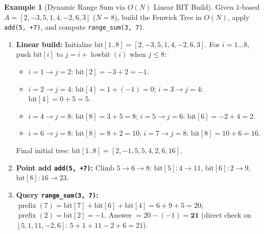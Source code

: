 \documentclass[11pt,a4paper]{article}
\theoremstyle{definition}
\newtheorem{example}{Example}[section]
\begin{document}
\begin{example}[Dynamic Range Sum via $O(N)$ Linear BIT Build]
Given $1$-based $A = [2, -3, 5, 1, 4, -2, 6, 3]$ ($N = 8$), build the Fenwick Tree in $O(N)$, apply \texttt{add(5, +7)}, and compute \texttt{range\_sum(3, 7)}.
\begin{enumerate}[itemsep=2pt, topsep=2pt]
    \item \textbf{Linear build:} Initialize $\text{bit}[1..8] = [2, -3, 5, 1, 4, -2, 6, 3]$. For $i = 1 \dots 8$, push $\text{bit}[i]$ to $j = i + \operatorname{lowbit}(i)$ when $j \le 8$:
    \begin{itemize}[itemsep=1pt, topsep=1pt]
        \item $i=1 \to j=2$: $\text{bit}[2] = -3 + 2 = -1$.
        \item $i=2 \to j=4$: $\text{bit}[4] = 1 + (-1) = 0$; \quad $i=3 \to j=4$: $\text{bit}[4] = 0 + 5 = 5$.
        \item $i=4 \to j=8$: $\text{bit}[8] = 3 + 5 = 8$; \quad $i=5 \to j=6$: $\text{bit}[6] = -2 + 4 = 2$.
        \item $i=6 \to j=8$: $\text{bit}[8] = 8 + 2 = 10$; \quad $i=7 \to j=8$: $\text{bit}[8] = 10 + 6 = 16$.
    \end{itemize}
    Final initial tree: $\text{bit}[1..8] = [2, -1, 5, 5, 4, 2, 6, 16]$.
    \item \textbf{Point add \texttt{add(5, +7)}:} Climb $5 \to 6 \to 8$:
    $\text{bit}[5]: 4 \to 11$, $\text{bit}[6]: 2 \to 9$, $\text{bit}[8]: 16 \to 23$.
    \item \textbf{Query \texttt{range\_sum(3, 7)}:}
    $\operatorname{prefix}(7) = \text{bit}[7] + \text{bit}[6] + \text{bit}[4] = 6 + 9 + 5 = 20$;
    $\operatorname{prefix}(2) = \text{bit}[2] = -1$.
    Answer $= 20 - (-1) = \mathbf{21}$ (direct check on $[5, 1, 11, -2, 6]$: $5 + 1 + 11 - 2 + 6 = 21$).
\end{enumerate}
\end{example}
\end{document}
